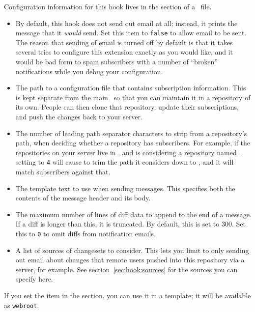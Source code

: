 Configuration information for this hook lives in the
 section of a \hgrc\ file.
\begin{itemize}
\item[\rcitem{notify}{test}] By default, this hook does not send out
  email at all; instead, it prints the message that it \emph{would}
  send.  Set this item to \texttt{false} to allow email to be sent.
  The reason that sending of email is turned off by default is that it
  takes several tries to configure this extension exactly as you would
  like, and it would be bad form to spam subscribers with a number of
  ``broken'' notifications while you debug your configuration.
\item[\rcitem{notify}{config}] The path to a configuration file that
  contains subscription information.  This is kept separate from the
  main \hgrc\ so that you can maintain it in a repository of its own.
  People can then clone that repository, update their subscriptions,
  and push the changes back to your server.
\item[\rcitem{notify}{strip}] The number of leading path separator
  characters to strip from a repository's path, when deciding whether
  a repository has subscribers.  For example, if the repositories on
  your server live in , and  is
  considering a repository named ,
  setting  to \texttt{4} will cause
   to trim the path it considers down to
  , and it will match subscribers against that.
\item[\rcitem{notify}{template}] The template text to use when sending
  messages.  This specifies both the contents of the message header
  and its body.
\item[\rcitem{notify}{maxdiff}] The maximum number of lines of diff
  data to append to the end of a message.  If a diff is longer than
  this, it is truncated.  By default, this is set to 300.  Set this to
  \texttt{0} to omit diffs from notification emails.
\item[\rcitem{notify}{sources}] A list of sources of changesets to
  consider.  This lets you limit  to only sending out
  email about changes that remote users pushed into this repository
  via a server, for example.  See section~\ref{sec:hook:sources} for
  the sources you can specify here.
\end{itemize}

If you set the  item in the 
section, you can use it in a template; it will be available as
\texttt{webroot}.

